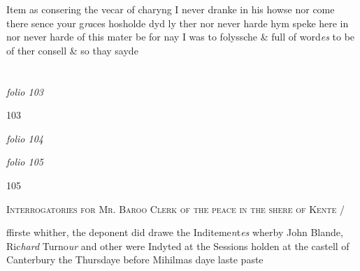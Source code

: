 \documentclass[12pt, a4paper]{book}
\begin{document}
		\ifthenelse{\isodd{\thepage}}
		{\reversemarginpar}
		{\normalmarginpar}
		Item as consering the vecar of charyng I never dranke
 	in his howse nor come there sence your g\textit{ra}ces hosholde dyd
 ly ther nor never harde hym speke here in nor never
 harde of this mater be for nay I was to folyssche \&  full
 of word\textit{es} to be of ther consell \& so thay sayde

\dotfill
					  \section*{}  \subsection*{}

\textit{folio 103}



\begin{flushright}{\color{Mahogany}103}\end{flushright}

\dotfill
					

\textit{folio 104}


               \vspace{4cm}
               
\dotfill
					

\textit{folio 105}


\begin{flushright}{\color{Mahogany}105}\end{flushright}

				\begin{center} \begin{large} {\scshape Interrogatories for Mr. Baroo
 Clerk of the peace in the shere
 of Kente /} \end{large} \end{center}
			

	
				\marginpar[\vspace{0.5cm}{\textcolor{Gray}{1.}}]{}
			
	
		\ifthenelse{\isodd{\thepage}}
		{\reversemarginpar}
		{\normalmarginpar}
		ffirste whither, the deponent did drawe the Inditeme\textit{n}t\textit{es}
		wherby John Blande, Ric\textit{hard} Turno\textit{ur} and other were Indyted
		at the Sessions holden at the castell of Canterbury the
 Thursdaye before Mihilmas daye laste paste
\end{document}
